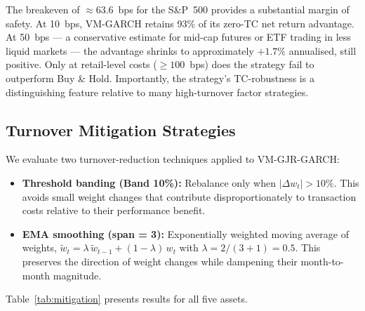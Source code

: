 \documentclass[12pt, a4paper]{article}
\begin{document}
The breakeven of $\approx$63.6~bps for the S\&P~500 provides a substantial margin of
safety. At 10~bps, VM-GARCH retains 93\% of its zero-TC net return advantage. At 50~bps
--- a conservative estimate for mid-cap futures or ETF trading in less liquid markets ---
the advantage shrinks to approximately $+1.7\%$ annualised, still positive. Only at
retail-level costs ($\geq 100$~bps) does the strategy fail to outperform Buy \& Hold.
Importantly, the strategy's TC-robustness is a distinguishing feature relative to many
high-turnover factor strategies.

\subsection{Turnover Mitigation Strategies}

We evaluate two turnover-reduction techniques applied to VM-GJR-GARCH:
\begin{itemize}[noitemsep]
  \item \textbf{Threshold banding (Band 10\%):} Rebalance only when $|\Delta w_t| > 10\%$.
        This avoids small weight changes that contribute disproportionately to transaction
        costs relative to their performance benefit.
  \item \textbf{EMA smoothing (span = 3):} Exponentially weighted moving average of
        weights, $\tilde{w}_t = \lambda\,\tilde{w}_{t-1} + (1-\lambda)\,w_t$ with
        $\lambda = 2/(3+1) = 0.5$. This preserves the direction of weight changes while
        dampening their month-to-month magnitude.
\end{itemize}

Table~\ref{tab:mitigation} presents results for all five assets.
\end{document}
